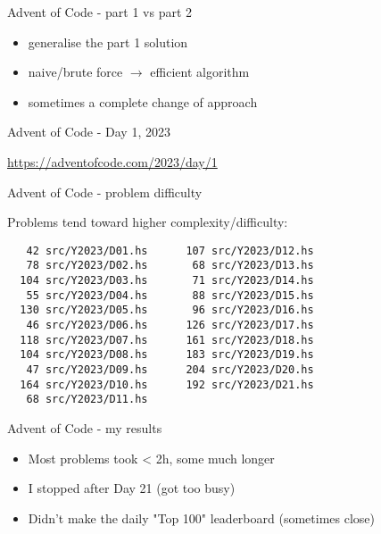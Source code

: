 \documentclass[ignorenonframetext,aspectratio=169,12pt]{beamer}
\begin{document}
\begin{frame}{Advent of Code - part 1 vs part 2}

    \begin{itemize}
        \item generalise the part 1 solution
        \item naive/brute force $\to$ efficient algorithm
        \item sometimes a complete change of approach
    \end{itemize}

\end{frame}


\begin{frame}{Advent of Code - Day 1, 2023}

    \centering
    \LARGE
    \url{https://adventofcode.com/2023/day/1}

\end{frame}


\begin{frame}[fragile]{Advent of Code - problem difficulty}

Problems tend toward higher complexity/difficulty:

\begin{verbatim}
   42 src/Y2023/D01.hs      107 src/Y2023/D12.hs
   78 src/Y2023/D02.hs       68 src/Y2023/D13.hs
  104 src/Y2023/D03.hs       71 src/Y2023/D14.hs
   55 src/Y2023/D04.hs       88 src/Y2023/D15.hs
  130 src/Y2023/D05.hs       96 src/Y2023/D16.hs
   46 src/Y2023/D06.hs      126 src/Y2023/D17.hs
  118 src/Y2023/D07.hs      161 src/Y2023/D18.hs
  104 src/Y2023/D08.hs      183 src/Y2023/D19.hs
   47 src/Y2023/D09.hs      204 src/Y2023/D20.hs
  164 src/Y2023/D10.hs      192 src/Y2023/D21.hs
   68 src/Y2023/D11.hs
\end{verbatim}

\end{frame}


\begin{frame}{Advent of Code - my results}

    \begin{itemize}
        \item Most problems took < 2h, some much longer
        \item I stopped after Day 21 (got too busy)
        \item Didn't make the daily "Top 100" leaderboard (sometimes close)
    \end{itemize}

\end{frame}
\end{document}
